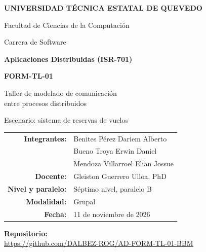 \documentclass[12pt,a4paper]{article}
\newcommand{\repourl}{https://github.com/DALBEZ-ROG/AD-FORM-TL-01-BBM}
\newcommand{\fecha}{11 de noviembre de 2026}
\begin{document}
\begin{center}
  {\Large\bfseries UNIVERSIDAD TÉCNICA ESTATAL DE QUEVEDO\par}
  \vspace{4pt}
  {\large Facultad de Ciencias de la Computación\par}
  {\large Carrera de Software\par}
  \vspace{1.6cm}
  {\large\bfseries Aplicaciones Distribuidas (ISR-701)\par}
  \vspace{0.8cm}
  {\Large\bfseries FORM-TL-01\par}
  \vspace{4pt}
  {\large Taller de modelado de comunicación\\ entre procesos distribuidos\par}
  \vspace{4pt}
  {Escenario: sistema de reservas de vuelos\par}
\end{center}

\vspace{1.4cm}
\begin{center}
\renewcommand{\arraystretch}{1.5}
\begin{tabular}{>{\bfseries}r l}
  Integrantes: & Benites Pérez Dariem Alberto \\
               & Bueno Troya Erwin Daniel \\
               & Mendoza Villarroel Elian Jossue \\
  Docente:     & Gleiston Guerrero Ulloa, PhD \\
  Nivel y paralelo: & Séptimo nivel, paralelo B \\
  Modalidad:   & Grupal \\
  Fecha:       & \fecha \\
\end{tabular}
\end{center}

\vfill
\begin{center}
  {\bfseries Repositorio:}\\[4pt]
  {\small\url{\repourl}}
\end{center}
\vspace{1cm}
\end{document}
